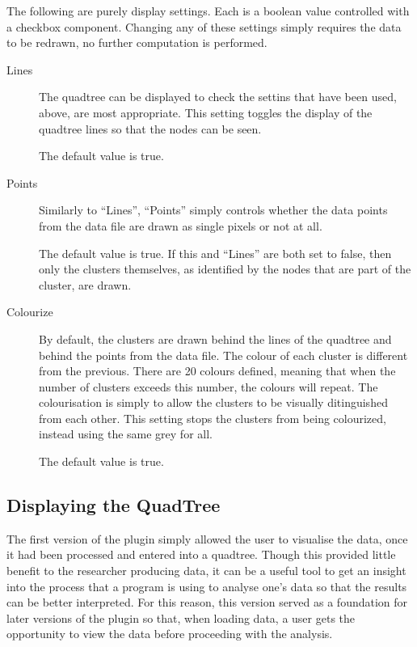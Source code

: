 The following are purely display settings. Each is a boolean value controlled
with a checkbox component. Changing any of these settings simply requires the
data to be redrawn, no further computation is performed.
\begin{description}
	\item[Lines] The quadtree can be displayed to check the settins that have
		been used, above, are most appropriate. This setting toggles the
		display of the quadtree lines so that the nodes can be seen.

		The default value is true.

	\item[Points] Similarly to ``Lines'', ``Points'' simply controls whether
		the data points from the data file are drawn as single pixels or not at
		all.

		The default value is true. If this and ``Lines'' are both set to false,
		then only the clusters themselves, as identified by the nodes that are
		part of the cluster, are drawn.

	\item[Colourize] By default, the clusters are drawn behind the lines of the
		quadtree and behind the points from the data file. The colour of each
		cluster is different from the previous. There are 20 colours defined,
		meaning that when the number of clusters exceeds this number, the
		colours will repeat. The colourisation is simply to allow the clusters
		to be visually ditinguished from each other. This setting stops the
		clusters from being colourized, instead using the same grey for all.

		The default value is true.
\end{description}

\subsection{Displaying the QuadTree}
\label{sub:displaying_the_quadtree}

The first version of the plugin simply allowed the user to visualise the data,
once it had been processed and entered into a quadtree. Though this provided
little benefit to the researcher producing data, it can be a useful tool to get
an insight into the process that a program is using to analyse one's data so
that the results can be better interpreted. For this reason, this version
served as a foundation for later versions of the plugin so that, when loading
data, a user gets the opportunity to view the data before proceeding with the
analysis.

